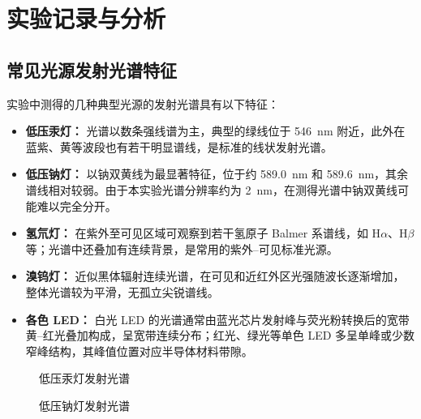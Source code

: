 \documentclass[a4paper,8pt,twocolumn]{article}
\begin{document}
\section{实验记录与分析}

\subsection{常见光源发射光谱特征}

实验中测得的几种典型光源的发射光谱具有以下特征：

\begin{itemize}
  \item \textbf{低压汞灯：} 光谱以数条强线谱为主，典型的绿线位于 \SI{546}{\nano\meter} 附近，此外在蓝紫、黄等波段也有若干明显谱线，是标准的线状发射光谱。
  \item \textbf{低压钠灯：} 以钠双黄线为最显著特征，位于约 \SI{589.0}{\nano\meter} 和 \SI{589.6}{\nano\meter}，其余谱线相对较弱。由于本实验光谱分辨率约为 \SI{2}{\nano\meter}，在测得光谱中钠双黄线可能难以完全分开。
  \item \textbf{氢氘灯：} 在紫外至可见区域可观察到若干氢原子 Balmer 系谱线，如 H$\alpha$、H$\beta$ 等；光谱中还叠加有连续背景，是常用的紫外–可见标准光源。
  \item \textbf{溴钨灯：} 近似黑体辐射连续光谱，在可见和近红外区光强随波长逐渐增加，整体光谱较为平滑，无孤立尖锐谱线。
  \item \textbf{各色 LED：} 白光 LED 的光谱通常由蓝光芯片发射峰与荧光粉转换后的宽带黄–红光叠加构成，呈宽带连续分布；红光、绿光等单色 LED 多呈单峰或少数窄峰结构，其峰值位置对应半导体材料带隙。
\end{itemize}


\begin{figure}[htbp]
  \centering
  \caption{低压汞灯发射光谱}
\end{figure}

\begin{figure}[htbp]
  \centering
  \caption{低压钠灯发射光谱}
\end{figure}
\end{document}

